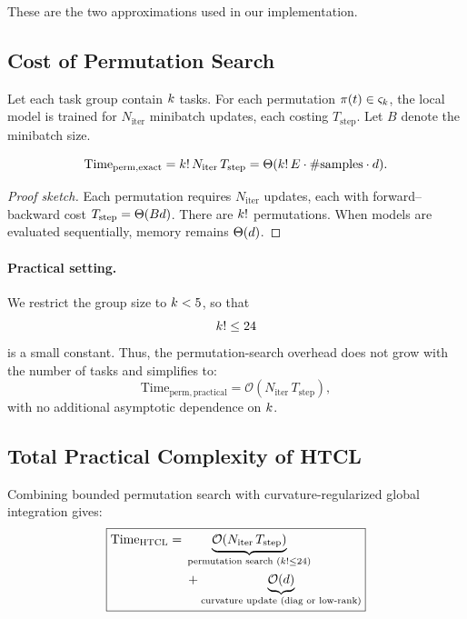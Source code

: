 These are the two approximations used in our implementation.

\subsection{Cost of Permutation Search}

Let each task group contain $k$ tasks.  
For each permutation $\pi(t)\in \varsigma_k$, the local model is trained for $N_{\text{iter}}$ minibatch updates, 
each costing $T_{\text{step}}$.  
Let $B$ denote the minibatch size.

\begin{proposition}
\[
\text{Time}_{\mathrm{perm,exact}}
= k!\, N_{\text{iter}}\, T_{\text{step}}
= \Theta(k!\, E \cdot \text{\#samples} \cdot d).
\]
\end{proposition}

\begin{proof}[Proof sketch]
Each permutation requires $N_{\text{iter}}$ updates, each with forward--backward cost  
$T_{\text{step}} = \Theta(Bd)$.  
There are $k!$ permutations.  
When models are evaluated sequentially, memory remains $\Theta(d)$.  
\end{proof}

\paragraph{Practical setting.}  
We restrict the group size to $k < 5$, so that  
\[
k! \le 24
\]
is a small constant.  
Thus, the permutation-search overhead does not grow with the number of tasks and simplifies to:
\[
\text{Time}_{\mathrm{perm,practical}}
= \mathcal{O}(N_{\text{iter}}\,T_{\text{step}}),
\]
with no additional asymptotic dependence on $k$.

\subsection{Total Practical Complexity of HTCL}

Combining bounded permutation search with curvature-regularized global integration gives:
\[
\boxed{
\begin{aligned}
\text{Time}_{\mathrm{HTCL}} 
={}&
\underbrace{\mathcal{O}(N_{\text{iter}}\,T_{\text{step}})}_{\text{permutation search } (k! \le 24)} \\
&+
\underbrace{\mathcal{O}(d)}_{\text{curvature update (diag or low-rank)}}
\end{aligned}
}
\]

